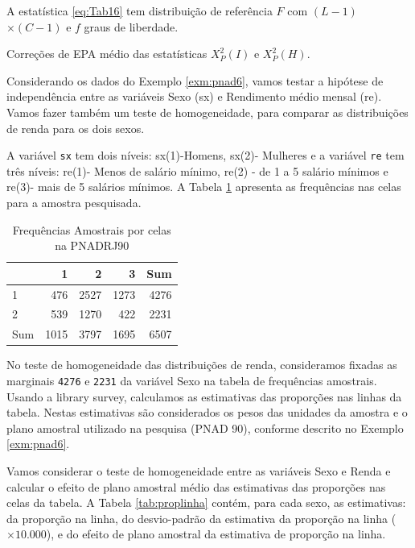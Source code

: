 \documentclass[]{book}
\theoremstyle{definition}
\theoremstyle{definition}
\theoremstyle{definition}
\theoremstyle{remark}
\let\BeginKnitrBlock\begin \let\EndKnitrBlock\end
\begin{document}
A estatística \eqref{eq:Tab16} tem distribuição de referência \(F\) com
\(\left( L-1\right)\) \(\times\left( C-1\right)\) e \(f\) graus de
liberdade.

\BeginKnitrBlock{example}
\protect\hypertarget{exm:exe81}{}{\label{exm:exe81} }Correções de EPA médio
das estatísticas \(X_{P}^{2}\left(I\right)\) e
\(X_{P}^{2}\left(H\right)\).
\EndKnitrBlock{example}

Considerando os dados do Exemplo \ref{exm:pnad6}, vamos testar a
hipótese de independência entre as variáveis Sexo (sx) e Rendimento
médio mensal (re). Vamos fazer também um teste de homogeneidade, para
comparar as distribuições de renda para os dois sexos.

A variável \texttt{sx} tem dois níveis: sx(1)-Homens, sx(2)- Mulheres e
a variável \texttt{re} tem três níveis: re(1)- Menos de salário mínimo,
re(2) - de 1 a 5 salário mínimos e re(3)- mais de 5 salários mínimos. A
Tabela \ref{tab:frqamost} apresenta as frequências nas celas para a
amostra pesquisada.

\begin{table}

\caption{\label{tab:frqamost}Frequências Amostrais por celas na PNADRJ90}
\centering
\begin{tabular}[t]{l|r|r|r|r}
\hline
  & 1 & 2 & 3 & Sum\\
\hline
1 & 476 & 2527 & 1273 & 4276\\
\hline
2 & 539 & 1270 & 422 & 2231\\
\hline
Sum & 1015 & 3797 & 1695 & 6507\\
\hline
\end{tabular}
\end{table}

No teste de homogeneidade das distribuições de renda, consideramos
fixadas as marginais \texttt{4276} e \texttt{2231} da variável Sexo na
tabela de frequências amostrais. Usando a library survey, calculamos as
estimativas das proporções nas linhas da tabela. Nestas estimativas são
considerados os pesos das unidades da amostra e o plano amostral
utilizado na pesquisa (PNAD 90), conforme descrito no Exemplo
\ref{exm:pnad6}.

Vamos considerar o teste de homogeneidade entre as variáveis Sexo e
Renda e calcular o efeito de plano amostral médio das estimativas das
proporções nas celas da tabela. A Tabela \ref{tab:proplinha} contém,
para cada sexo, as estimativas: da proporção na linha, do desvio-padrão
da estimativa da proporção na linha (\(\times10.000\)), e do efeito de
plano amostral da estimativa de proporção na linha.
\end{document}
